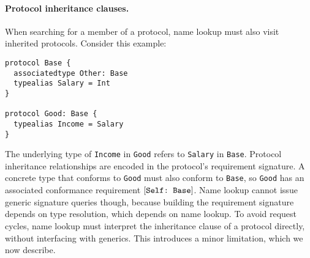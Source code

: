\documentclass[../generics]{subfiles}
\begin{document}
\paragraph{Protocol inheritance clauses.} When searching for a member of a protocol, name lookup must also visit inherited protocols. Consider this example:
\begin{Verbatim}
protocol Base {
  associatedtype Other: Base
  typealias Salary = Int
}

protocol Good: Base {
  typealias Income = Salary
}
\end{Verbatim}
The underlying type of \texttt{Income} in \texttt{Good} refers to \texttt{Salary} in \texttt{Base}.
Protocol inheritance relationships are encoded in the protocol's requirement signature. A concrete type that conforms to \texttt{Good} must also conform to \texttt{Base}, so \texttt{Good} has an associated conformance requirement $[\texttt{Self:~Base}]$. Name lookup cannot issue generic signature queries though, because building the requirement signature depends on type resolution, which depends on name lookup. To avoid request cycles, name lookup must interpret the inheritance clause of a protocol directly, without interfacing with generics. This introduces a minor limitation, which we now describe.
\end{document}

